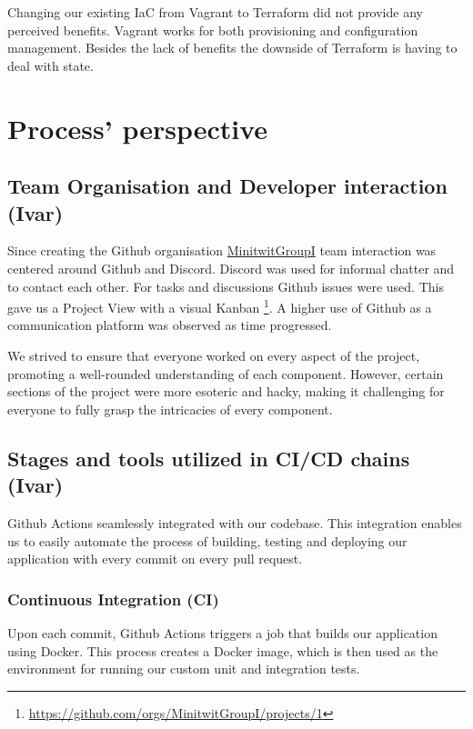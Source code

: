 \documentclass{article}
\begin{document}
Changing our existing IaC from Vagrant to Terraform did not provide any perceived benefits. Vagrant works for both provisioning and configuration management. Besides the lack of benefits the downside of Terraform is having to deal with state. 

\section{Process' perspective} \label{cicd}

\subsection{Team Organisation and Developer interaction (Ivar)} 

Since creating the Github organisation \href{https://github.com/MinitwitGroupI/}{MinitwitGroupI} team interaction was centered around Github and Discord. Discord was used for informal chatter and to contact each other. For tasks and discussions Github issues were used. This gave us a Project View with a visual Kanban \footnote{\url{https://github.com/orgs/MinitwitGroupI/projects/1}}. A higher use of Github as a communication platform was observed as time progressed. 

We strived to ensure that everyone worked on every aspect of the project, promoting a well-rounded understanding of each component. However, certain sections of the project were more esoteric and hacky, making it challenging for everyone to fully grasp the intricacies of every component. 


\subsection{Stages and tools utilized in CI/CD chains (Ivar)}

Github Actions seamlessly integrated with our codebase. This integration enables us to easily automate the process of building, testing and deploying our application with every commit on every pull request.

\subsubsection{Continuous Integration (CI)}

Upon each commit, Github Actions triggers a job that builds our application using Docker. This process creates a Docker image, which is then used as the environment for running our custom unit and integration tests.
\end{document}
